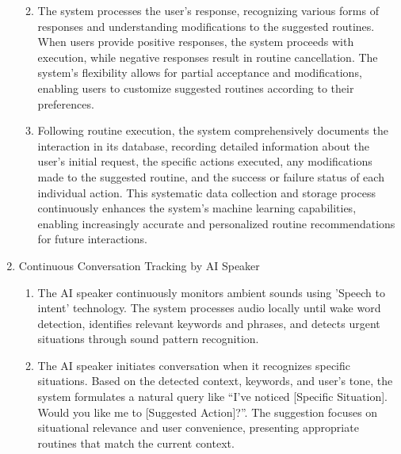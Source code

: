 \documentclass[conference]{IEEEtran}
\begin{document}
\begin{enumerate}[label=\arabic*]
\begin{enumerate}[label=\arabic*)]
        \vspace{0.5em}

        \item The system processes the user's response, recognizing various forms of responses and understanding modifications to the suggested routines. When users provide positive responses, the system proceeds with execution, while negative responses result in routine cancellation. The system's flexibility allows for partial acceptance and modifications, enabling users to customize suggested routines according to their preferences.

        \vspace{0.5em}

        \item Following routine execution, the system comprehensively documents the interaction in its database, recording detailed information about the user's initial request, the specific actions executed, any modifications made to the suggested routine, and the success or failure status of each individual action. This systematic data collection and storage process continuously enhances the system's machine learning capabilities, enabling increasingly accurate and personalized routine recommendations for future interactions.
    \end{enumerate}

    \vspace{1em}

    \item Continuous Conversation Tracking  by AI Speaker\par
    \vspace{0.3em}

    \begin{enumerate}[label=\arabic*)]
        \item The AI speaker continuously monitors ambient sounds using 'Speech to intent' technology. The system processes audio locally until wake word detection, identifies relevant keywords and phrases, and detects urgent situations through sound pattern recognition.

        \vspace{0.5em}

        \item The AI speaker initiates conversation when it recognizes specific situations. Based on the detected context, keywords, and user's tone, the system formulates a natural query like “I've noticed [Specific Situation]. Would you like me to [Suggested Action]?”. The suggestion focuses on situational relevance and user convenience, presenting appropriate routines that match the current context.


\end{enumerate}
\end{enumerate}
\end{document}
